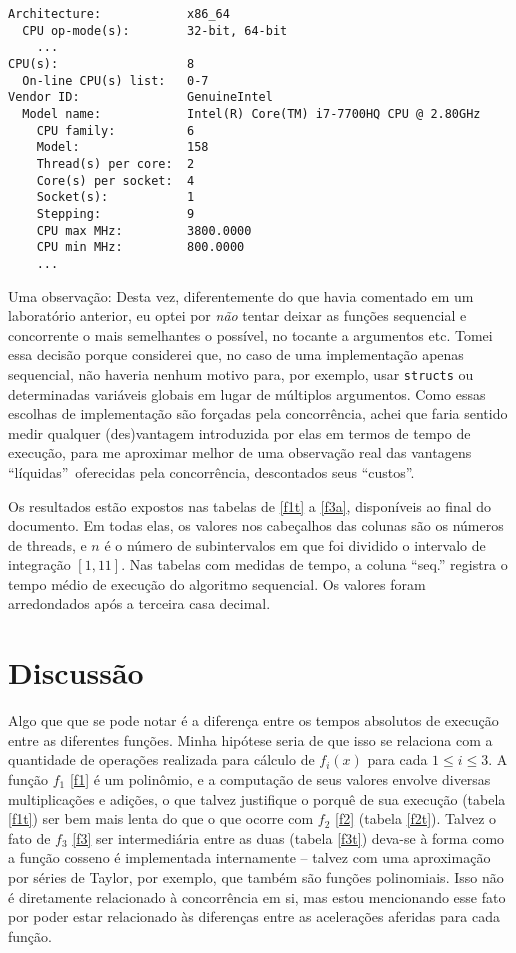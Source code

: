 \documentclass{article}
\begin{document}
\begin{lstlisting}
Architecture:            x86_64
  CPU op-mode(s):        32-bit, 64-bit
    ...
CPU(s):                  8
  On-line CPU(s) list:   0-7
Vendor ID:               GenuineIntel
  Model name:            Intel(R) Core(TM) i7-7700HQ CPU @ 2.80GHz
    CPU family:          6
    Model:               158
    Thread(s) per core:  2
    Core(s) per socket:  4
    Socket(s):           1
    Stepping:            9
    CPU max MHz:         3800.0000
    CPU min MHz:         800.0000
    ...
\end{lstlisting}

  Uma observação: Desta vez, diferentemente do que havia comentado em um laboratório anterior, eu optei por \emph{não} tentar deixar as funções sequencial e concorrente o mais semelhantes o possível, no tocante a argumentos etc. Tomei essa decisão porque considerei que, no caso de uma implementação apenas sequencial, não haveria nenhum motivo para, por exemplo, usar \texttt{structs} ou determinadas variáveis globais em lugar de múltiplos argumentos. Como essas escolhas de implementação são forçadas pela concorrência, achei 
  que faria sentido medir qualquer (des)vantagem introduzida por elas 
  em termos de tempo de execução, para me aproximar melhor de uma 
  observação real das vantagens ``líquidas''\ oferecidas pela concorrência, descontados seus ``custos''.

  Os resultados estão expostos nas tabelas de \ref{f1t} a \ref{f3a}, disponíveis ao final do documento. Em todas elas, os valores nos cabeçalhos das colunas são os números de threads, e $n$ é o número de subintervalos em que foi dividido o intervalo de integração $[1, 11]$. Nas tabelas com medidas de tempo, a coluna ``seq.'' registra o tempo médio de execução do algoritmo sequencial. Os valores foram arredondados após a terceira casa decimal.

  \section{Discussão} \label{disc}

  Algo que que se pode notar é a diferença entre os tempos absolutos de execução entre as diferentes funções. Minha hipótese seria de que isso se relaciona com a quantidade de operações realizada para cálculo de $f_i(x)$ para cada $1 \leq i \leq 3$. A função $f_1$ \eqref{f1} é um polinômio, e a computação de seus valores envolve diversas multiplicações e adições, o que talvez justifique o porquê de sua execução (tabela \ref{f1t}) ser bem mais lenta do que o que ocorre com $f_2$ \eqref{f2} (tabela \ref{f2t}). Talvez o fato de $f_3$ \eqref{f3} ser intermediária entre as duas (tabela \eqref{f3t}) deva-se à forma como a função cosseno é implementada internamente -- talvez com uma aproximação por séries de Taylor, por exemplo, que também são funções polinomiais. Isso não é diretamente relacionado à concorrência em si, mas estou mencionando esse fato por poder estar relacionado às diferenças entre as acelerações aferidas para cada função.
\end{document}
